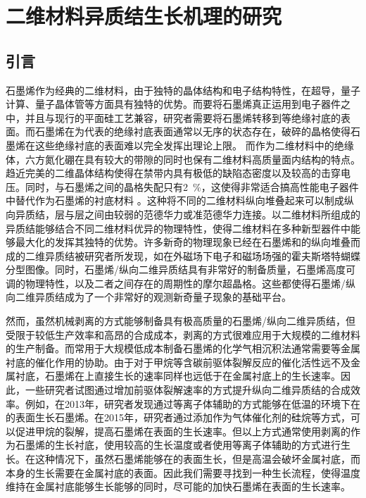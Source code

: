 \chapter{二维材料异质结生长机理的研究}
\section{引言}
石墨烯作为经典的二维材料，由于独特的晶体结构和电子结构特性，在超导，量子计算、量子晶体管等方面具有独特的优势。而要将石墨烯真正运用到电子器件之中，并且与现行的平面硅工艺兼容，研究者需要将石墨烯转移到等绝缘衬底的表面。而石墨烯在为代表的绝缘衬底表面通常以无序的状态存在，破碎的晶格使得石墨烯在这些绝缘衬底的表面难以完全发挥出理论上限。
而作为二维材料中的绝缘体，六方氮化硼在具有较大的带隙的同时也保有二维材料高质量面内结构的特点。趋近完美的二维晶体结构使得在禁带内具有极低的缺陷态密度以及较高的击穿电压。同时，与石墨烯之间的晶格失配只有\SI{2}{\percent}，这使得非常适合搞高性能电子器件中替代作为石墨烯的衬底材料 。这种将不同的二维材料纵向堆叠起来可以制成纵向异质结，层与层之间由较弱的范德华力或准范德华力连接。以二维材料所组成的异质结能够结合不同二维材料优异的物理特性，使得二维材料在多种新型器件中能够最大化的发挥其独特的优势。许多新奇的物理现象已经在石墨烯和的纵向堆叠而成的二维异质结被研究者所发现，如在外磁场下电子和磁场场强的霍夫斯塔特蝴蝶分型图像。同时，石墨烯/纵向二维异质结具有非常好的制备质量，石墨烯高度可调的物理特性，以及二者之间存在的周期性的摩尔超晶格。这些都使得石墨烯/纵向二维异质结成为了一个非常好的观测新奇量子现象的基础平台。

然而，虽然机械剥离的方式能够制备具有极高质量的石墨烯/纵向二维异质结，但受限于较低生产效率和高昂的合成成本，剥离的方式很难应用于大规模的二维材料的生产制备。而常用于大规模低成本制备石墨烯的化学气相沉积法通常需要等金属衬底的催化作用的协助。由于对于甲烷等含碳前驱体裂解反应的催化活性远不及金属衬底，石墨烯在上直接生长的速率同样也远低于在金属衬底上的生长速率。因此，一些研究者试图通过增加前驱体裂解速率的方式提升纵向二维异质结的合成效率。例如，在2013年，研究者发现通过等离子体辅助的方式能够在低温的环境下在的表面生长石墨烯。在2015年，研究者通过添加作为气体催化剂的硅烷等方式，可以促进甲烷的裂解，提高石墨烯在表面的生长速率。但以上方式通常使用剥离的作为石墨烯的生长衬底，使用较高的生长温度或者使用等离子体辅助的方式进行生长。在这种情况下，虽然石墨烯能够在的表面生长，但是高温会破坏金属衬底，而本身的生长需要在金属衬底的表面。因此我们需要寻找到一种生长流程，使得温度维持在金属衬底能够生长能够的同时，尽可能的加快石墨烯在表面的生长速率。

